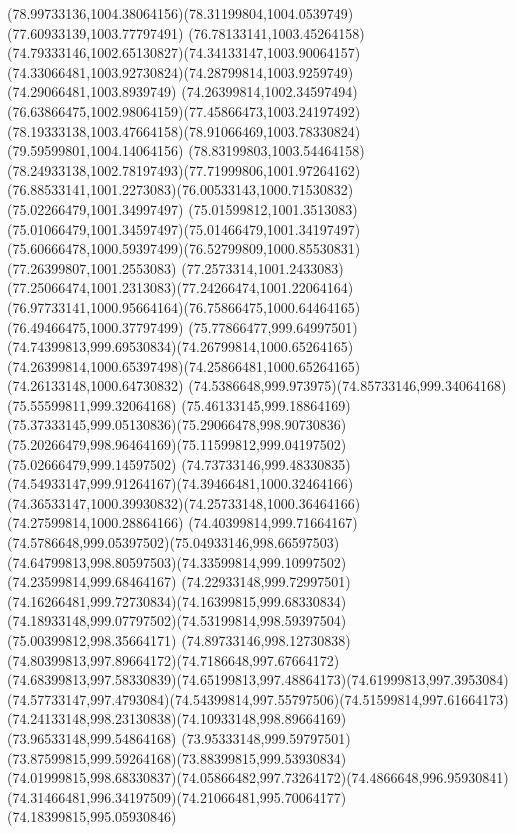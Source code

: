 {    \curveto(78.99733136,1004.38064156)(78.31199804,1004.0539749)(77.60933139,1003.77797491)
    \curveto(76.78133141,1003.45264158)(74.79333146,1002.65130827)(74.34133147,1003.90064157)
    \curveto(74.33066481,1003.92730824)(74.28799814,1003.9259749)(74.29066481,1003.8939749)
    \curveto(74.26399814,1002.34597494)(76.63866475,1002.98064159)(77.45866473,1003.24197492)
    \curveto(78.19333138,1003.47664158)(78.91066469,1003.78330824)(79.59599801,1004.14064156)
    \curveto(78.83199803,1003.54464158)(78.24933138,1002.78197493)(77.71999806,1001.97264162)
    \curveto(76.88533141,1001.2273083)(76.00533143,1000.71530832)(75.02266479,1001.34997497)
    \curveto(75.01599812,1001.3513083)(75.01066479,1001.34597497)(75.01466479,1001.34197497)
    \curveto(75.60666478,1000.59397499)(76.52799809,1000.85530831)(77.26399807,1001.2553083)
    \curveto(77.2573314,1001.2433083)(77.25066474,1001.2313083)(77.24266474,1001.22064164)
    \curveto(76.97733141,1000.95664164)(76.75866475,1000.64464165)(76.49466475,1000.37797499)
    \curveto(75.77866477,999.64997501)(74.74399813,999.69530834)(74.26799814,1000.65264165)
    \curveto(74.26399814,1000.65397498)(74.25866481,1000.65264165)(74.26133148,1000.64730832)
    \curveto(74.5386648,999.973975)(74.85733146,999.34064168)(75.55599811,999.32064168)
    \curveto(75.46133145,999.18864169)(75.37333145,999.05130836)(75.29066478,998.90730836)
    \curveto(75.20266479,998.96464169)(75.11599812,999.04197502)(75.02666479,999.14597502)
    \curveto(74.73733146,999.48330835)(74.54933147,999.91264167)(74.39466481,1000.32464166)
    \curveto(74.36533147,1000.39930832)(74.25733148,1000.36464166)(74.27599814,1000.28864166)
    \curveto(74.40399814,999.71664167)(74.5786648,999.05397502)(75.04933146,998.66597503)
    \curveto(74.64799813,998.80597503)(74.33599814,999.10997502)(74.23599814,999.68464167)
    \curveto(74.22933148,999.72997501)(74.16266481,999.72730834)(74.16399815,999.68330834)
    \curveto(74.18933148,999.07797502)(74.53199814,998.59397504)(75.00399812,998.35664171)
    \curveto(74.89733146,998.12730838)(74.80399813,997.89664172)(74.7186648,997.67664172)
    \curveto(74.68399813,997.58330839)(74.65199813,997.48864173)(74.61999813,997.3953084)
    \curveto(74.57733147,997.4793084)(74.54399814,997.55797506)(74.51599814,997.61664173)
    \curveto(74.24133148,998.23130838)(74.10933148,998.89664169)(73.96533148,999.54864168)
    \curveto(73.95333148,999.59797501)(73.87599815,999.59264168)(73.88399815,999.53930834)
    \curveto(74.01999815,998.68330837)(74.05866482,997.73264172)(74.4866648,996.95930841)
    \curveto(74.31466481,996.34197509)(74.21066481,995.70064177)(74.18399815,995.05930846)
}
